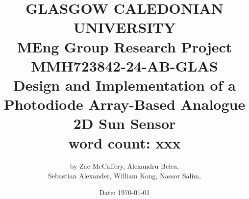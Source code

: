 \title{
    {\LARGE\textbf{GLASGOW CALEDONIAN UNIVERSITY}} \\
    \vspace{1.5cm}
    {\LARGE MEng Group Research Project } \\
    \vspace{0.5cm}
    {\LARGE MMH723842-24-AB-GLAS} \\
    \vspace{1.5cm}
    {\LARGE\textbf{Design and Implementation of a Photodiode Array-Based Analogue 2D Sun Sensor}} \\
    \vspace{0.5cm}
    {\large word count: xxx} \\
}

\author{
    by Zac McCaffery, Alexandru Belea,  \\
    Sebastian Alexander, William Kong, Nassor Salim,
}

\date{
    Date: \today
}
